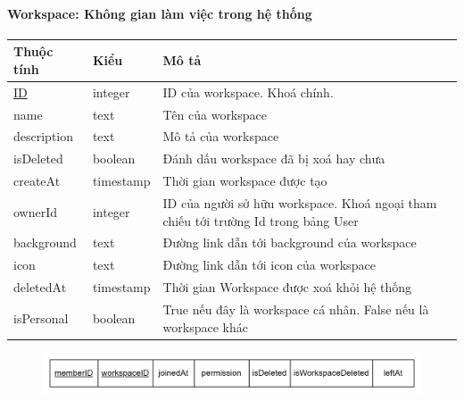 \paragraph{Workspace: Không gian làm việc trong hệ thống}
\begin{center}
\begin{tabular}{ |p{2cm} |p{3cm} |p{9cm}|} 
 \hline
    Thuộc tính & Kiểu & Mô tả \\ [0.5ex] 
 \hline
 \underline{ID} & integer & ID của workspace. Khoá chính. \\ 
 \hline
 name & text & Tên của workspace \\
 \hline
 description & text & Mô tả của workspace \\
 \hline
 isDeleted & boolean & Đánh dấu workspace đã bị xoá hay chưa \\
 \hline
 createAt & timestamp & Thời gian workspace được tạo \\
 \hline
 ownerId & integer & ID của người sở hữu workspace.
 Khoá ngoại tham chiếu tới trường Id trong bảng User \\
 \hline
 background & text & Đường link dẫn tới background của workspace \\
 \hline
 icon & text & Đường link dẫn tới icon của workspace \\
 \hline
 deletedAt & timestamp & Thời gian Workspace được xoá khỏi hệ thống \\
 \hline
 isPersonal & boolean & True nếu đây là workspace cá nhân. False nếu là workspace khác \\
 \hline
\end{tabular}
\end{center}
\begin{figure}[h]
        \centering
        \includegraphics[width=\textwidth]{Content/Phân tích và thiết kế hệ thống/images/ERD_mapping/joinWorkspace_mapping.png}
        \label{fig:enter-label}
\end{figure}

